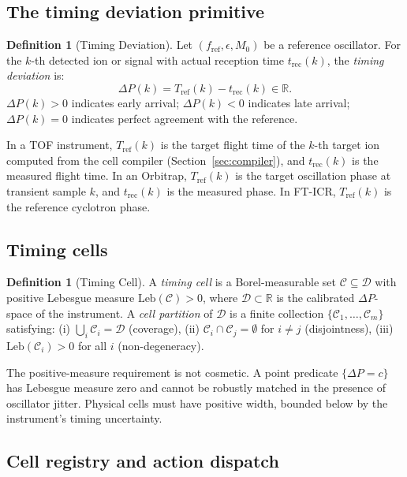 \documentclass[twocolumn,10pt,a4paper]{article}
\theoremstyle{thmstyle}
\theoremstyle{definition}
\newtheorem{definition}[theorem]{Definition}
\theoremstyle{remark}
\newcommand{\R}{\mathbb{R}}
\newcommand{\DP}{\Delta P}
\newcommand{\Tref}{T_{\mathrm{ref}}}
\newcommand{\trec}{t_{\mathrm{rec}}}
\newcommand{\fref}{f_{\mathrm{ref}}}
\newcommand{\calC}{\mathcal{C}}
\newcommand{\calD}{\mathcal{D}}
\newcommand{\Leb}{\mathrm{Leb}}
\begin{document}
\subsection{The timing deviation primitive}

\begin{definition}[Timing Deviation]
\label{def:dp}
Let $(\fref, \epsilon, M_0)$ be a reference oscillator. For the $k$-th
detected ion or signal with actual reception time $\trec(k)$, the
\emph{timing deviation} is:
\begin{equation}
\DP(k) = \Tref(k) - \trec(k) \in \R.
\label{eq:dp}
\end{equation}
$\DP(k) > 0$ indicates early arrival; $\DP(k) < 0$ indicates late arrival;
$\DP(k) = 0$ indicates perfect agreement with the reference.
\end{definition}

In a TOF instrument, $\Tref(k)$ is the target flight time of the $k$-th
target ion computed from the cell compiler (Section~\ref{sec:compiler}),
and $\trec(k)$ is the measured flight time. In an Orbitrap, $\Tref(k)$
is the target oscillation phase at transient sample $k$, and $\trec(k)$
is the measured phase. In FT-ICR, $\Tref(k)$ is the reference cyclotron
phase.

\subsection{Timing cells}

\begin{definition}[Timing Cell]
\label{def:cell}
A \emph{timing cell} is a Borel-measurable set $\calC \subseteq \calD$
with positive Lebesgue measure $\Leb(\calC) > 0$, where
$\calD \subset \R$ is the calibrated $\DP$-space of the instrument.
A \emph{cell partition} of $\calD$ is a finite collection
$\{\calC_1, \ldots, \calC_m\}$ satisfying:
(i) $\bigcup_i \calC_i = \calD$ (coverage),
(ii) $\calC_i \cap \calC_j = \emptyset$ for $i \neq j$ (disjointness),
(iii) $\Leb(\calC_i) > 0$ for all $i$ (non-degeneracy).
\end{definition}

The positive-measure requirement is not cosmetic. A point predicate
$\{\DP = c\}$ has Lebesgue measure zero and cannot be robustly matched
in the presence of oscillator jitter. Physical cells must have positive
width, bounded below by the instrument's timing uncertainty.

\subsection{Cell registry and action dispatch}
\end{document}

